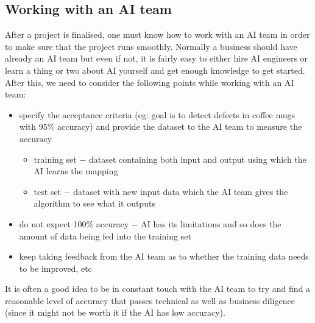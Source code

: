 \documentclass{article}[a4paper,12pt]
\theoremstyle{definition}
\begin{document}
\subsection{Working with an AI team}
After a project is finalised, one must know how to work with an AI team in order to make sure that the project runs smoothly. Normally a business should have already an AI team but even if not, it is fairly easy to either hire AI engineers or learn a thing or two about AI yourself and get enough knowledge to get started. After this, we need to consider the following points while working with an AI team:
\begin{itemize}
	\item specify the acceptance criteria (eg: goal is to detect defects in coffee mugs with 95\% accuracy) and provide the dataset to the AI team to measure the accuracy
	\begin{itemize}
		\item training set $-$ dataset containing both input and output using which the AI learns the mapping
		\item test set $-$ dataset with new input data which the AI team gives the algorithm to see what it outputs 
	\end{itemize}
	\item do not expect 100\% accuracy $-$ AI has its limitations and so does the amount of data being fed into the training set
	\item keep taking feedback from the AI team as to whether the training data needs to be improved, etc
\end{itemize}
It is often a good idea to be in constant touch with the AI team to try and find a reasonable level of accuracy that passes technical as well as business diligence (since it might not be worth it if the AI has low accuracy).
\pagebreak
\end{document}
